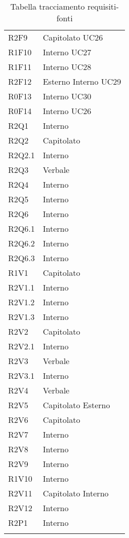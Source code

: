 \begin{center}
\begin{longtable}{  p{5cm} p{5cm} }
		R2F9 & Capitolato \newline UC26 \\
		R1F10 & Interno \newline UC27 \\
		R1F11 & Interno \newline UC28 \\
		R2F12 & Esterno \newline Interno \newline UC29 \\
		R0F13 & Interno \newline UC30 \\
		R0F14 & Interno \newline UC26\\
		R2Q1 & Interno \\
		R2Q2 & Capitolato \\
		R2Q2.1 & Interno \\
		R2Q3 & Verbale \\
		R2Q4 & Interno \\
		R2Q5 & Interno \\
		R2Q6 & Interno \\
		R2Q6.1 & Interno \\
		R2Q6.2 & Interno \\
		R2Q6.3 & Interno \\
		R1V1 & Capitolato \\
		R2V1.1 & Interno \\
		R2V1.2 & Interno \\
		R2V1.3 & Interno \\
		R2V2 & Capitolato \\
		R2V2.1 & Interno \\
		R2V3 & Verbale \\
		R2V3.1 & Interno \\
		R2V4 & Verbale \\
		R2V5 & Capitolato \newline Esterno \\
		R2V6 & Capitolato \\
		R2V7 & Interno \\
		R2V8 & Interno \\
		R2V9 & Interno \\
		R1V10 & Interno \\
		R2V11 & Capitolato \newline Interno \\
		R2V12 & Interno \\		
		R2P1 & Interno \\
		\rowcolor{white}
	\caption{Tabella tracciamento requisiti-fonti}
	\end{longtable}
\end{center}

